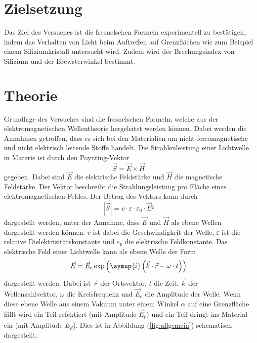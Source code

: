 \section{Zielsetzung}
\label{sec:Zielsetzung}
Das Ziel des Versuches ist die fresnelschen Formeln experimentell zu bestätigen, 
indem das Verhalten von Licht beim Auftreffen auf Grenzflächen wie zum Beispiel einem Siliziumkristall 
untersucht wird. Zudem wird der Brechungsindex von Silizium und der Brewsterwinkel bestimmt. 
\section{Theorie}
\label{sec:Theorie}
Grundlage des Versuches sind die fresnelschen Formeln, welche aus der elektromagnetischen Wellentheorie hergeleitet werden können. 
Dabei werden die Annahmen getroffen, dass es sich bei den Materialien um nicht-ferromagnetische und nicht elektrisch leitende Stoffe handelt. 
Die Strahlenleistung einer Lichtwelle in Materie ist durch den Poynting-Vektor 
\begin{equation}
    \vec{S} = \vec{E} \times \vec{H} 
    \label{eqn:Poyntingvektor}
\end{equation}
gegeben. Dabei sind $\vec{E}$ die elektrische Feldstärke und $\vec{H}$ die magnetische Feldstärke. 
Der Vektor beschreibt die Strahlungsleistung pro Fläche eines elektromagnetischen Feldes. 
Der Betrag des Vektors kann durch 
\begin{equation}
    |\vec{S}| = v \cdot \varepsilon \cdot \varepsilon_0 \cdot \vec{E}²
    \label{eqn:Poyntingbetrag}
\end{equation}
dargestellt werden, unter der Annahme, dass $\vec{E}$ und $\vec{H}$ als ebene Wellen dargestellt werden können. 
$v$ ist dabei die Geschwindigkeit der Welle, $\varepsilon$ ist die relative Dielektrizitätskonstante und $\varepsilon_0$ die elektrische Feldkonstante. 
Das elektrische Feld einer Lichtwelle kann als ebene Welle der Form 
\begin{equation}
    \vec{E} = \vec{E}_e \exp{\left(\symup{i}\left(\vec{k}\cdot \vec{r} - \omega \cdot t\right)\right)}
    \label{eqn:ebene_Welle}
\end{equation}
dargestellt werden. Dabei ist $\vec{r}$ der Ortsvektor, $t$ die Zeit, $\vec{k}$ der Wellenzahlvektor, 
$\omega$ die Kreisfrequenz und $\vec{E}_e$ die Amplitude der Welle. 
Wenn diese ebene Welle aus einem Vakuum unter einem Winkel $\alpha$ auf eine Grenzfläche fällt wird ein Teil refektiert (mit Amplitude $\vec{E}_r$)
und ein Teil dringt ins Material ein (mit Amplitude $\vec{E}_d$). Dies ist in Abbildung (\ref{fig:allgemein}) schematisch dargestellt. 
